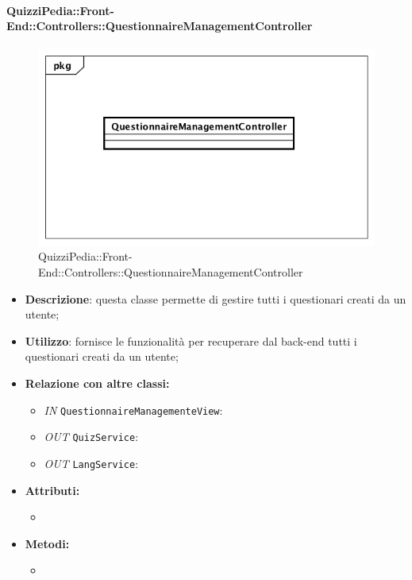 \paragraph{QuizziPedia::Front-End::Controllers::QuestionnaireManagementController}
\begin{figure}
	\centering
	\includegraphics[scale=0.45]{UML/Classi/Front-End/QuizziPedia_Front-end_Controller_QuestionnaireManagementController.png}
	\caption{QuizziPedia::Front-End::Controllers::QuestionnaireManagementController}
\end{figure}
\begin{itemize}
	\item \textbf{Descrizione}: questa classe permette di gestire tutti i questionari creati da un utente; 
	\item \textbf{Utilizzo}: fornisce le funzionalità per recuperare dal back-end tutti i questionari creati da un utente;
	\item \textbf{Relazione con altre classi:}
	\begin{itemize}
		\item \textit{IN} \texttt{QuestionnaireManagementeView}: 
		\item \textit{OUT} \texttt{QuizService}:
		\item \textit{OUT} \texttt{LangService}:
	\end{itemize}
	\item \textbf{Attributi:}
	\begin{itemize}
		\item 
	\end{itemize}
	\item \textbf{Metodi:}
	\begin{itemize}
		\item 
	\end{itemize}
\end{itemize}

